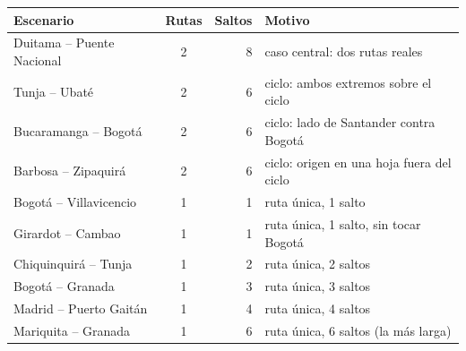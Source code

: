 \begin{tabular}{lcr>{\raggedright\arraybackslash}p{5.4cm}}
\toprule
\textbf{Escenario} & \textbf{Rutas} & \textbf{Saltos} & \textbf{Motivo} \\
\midrule
Duitama -- Puente Nacional & 2 & 8 & caso central: dos rutas reales \\
Tunja -- Ubaté & 2 & 6 & ciclo: ambos extremos sobre el ciclo \\
Bucaramanga -- Bogotá & 2 & 6 & ciclo: lado de Santander contra Bogotá \\
Barbosa -- Zipaquirá & 2 & 6 & ciclo: origen en una hoja fuera del ciclo \\
Bogotá -- Villavicencio & 1 & 1 & ruta única, 1 salto \\
Girardot -- Cambao & 1 & 1 & ruta única, 1 salto, sin tocar Bogotá \\
Chiquinquirá -- Tunja & 1 & 2 & ruta única, 2 saltos \\
Bogotá -- Granada & 1 & 3 & ruta única, 3 saltos \\
Madrid -- Puerto Gaitán & 1 & 4 & ruta única, 4 saltos \\
Mariquita -- Granada & 1 & 6 & ruta única, 6 saltos (la más larga) \\
\bottomrule
\end{tabular}
